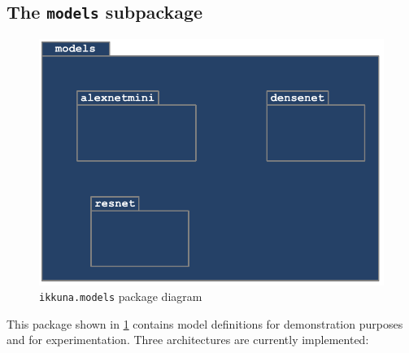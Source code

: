 \hypertarget{sec:pack-models}{%
\subsection{The \texttt{models} subpackage}\label{sec:pack-models}}

\begin{figure}
    \hypertarget{fig:pack-diag-models}{%
        \centering
        \includegraphics[max width=.7\textwidth]{gfx/diagrams/class_diagrams/models_package_diagram.pdf}
        \caption{\texttt{ikkuna.models} package diagram}\label{fig:pack-diag-models}
    }
\end{figure}

This package shown in \cref{fig:pack-diag-models} contains model
definitions for demonstration purposes and for experimentation. Three
architectures are currently implemented:

